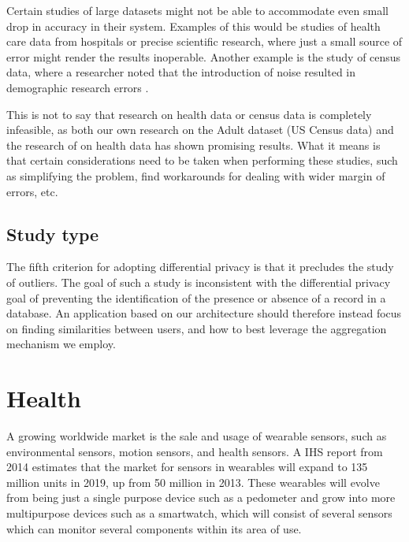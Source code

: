 Certain studies of large datasets might not be able to accommodate even small drop in accuracy in their system. Examples of this would be studies of health care data from hospitals or precise scientific research, where just a small source of error might render the results inoperable. Another example is the study of census data, where a researcher noted that the introduction of noise resulted in demographic research errors \citep{yakowitz2011tragedy}. 

This is not to say that research on health data or census data is completely infeasible, as both our own research on the Adult dataset (US Census data) and the research of \cite{ji2014DisLogReg} on health data has shown promising results. What it means is that certain considerations need to be taken when performing these studies, such as simplifying the problem, find workarounds for dealing with wider margin of errors, etc. 

\subsection{Study type}
The fifth criterion for adopting differential privacy is that it precludes the study of outliers. The goal of such a study is inconsistent with the differential privacy goal of preventing the identification of the presence or absence of a record in a database. An application based on our architecture should therefore instead focus on finding similarities between users, and how to best leverage the aggregation mechanism we employ. 

\section{Health}
A growing worldwide market is the sale and usage of wearable sensors, such as environmental sensors, motion sensors, and health sensors. A IHS report \cite{ihs2014reportwearables} from 2014 estimates that the market for sensors in wearables will expand to 135 million units in 2019, up from 50 million in 2013. These wearables will evolve from being just a single purpose device such as a pedometer and grow into more multipurpose devices such as a smartwatch, which will consist of several sensors which can monitor several components within its area of use. 

